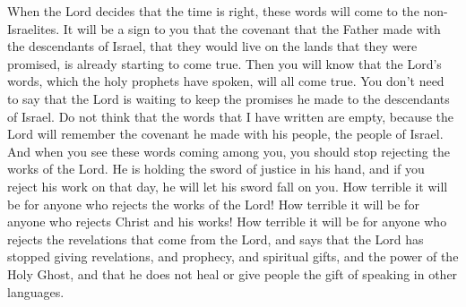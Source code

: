 When the Lord decides that the time is right, these words will come to the non-Israelites. It will be a sign to you that the covenant that the Father made with the descendants of Israel, that they would live on the lands that they were promised, is already starting to come true.
\bverse \iffalse And ye may know that the words of the Lord, which have been spoken by the holy prophets, shall all be fulfilled; and ye need not say that the Lord delays his coming unto the children of Israel. \fi
Then you will know that the Lord's words, which the holy prophets have spoken, will all come true. You don't need to say that the Lord is waiting to keep the promises he made to the descendants of Israel.
\bverse \iffalse And ye need not imagine in your hearts that the words which have been spoken are vain, for behold, the Lord will remember his covenant which he hath made unto his people of the house of Israel. \fi
Do not think that the words that I have written are empty, because the Lord will remember the covenant he made with his people, the people of Israel.
\bverse \iffalse And when ye shall see these sayings coming forth among you, then ye need not any longer spurn at the doings of the Lord, for the sword of his justice is in his right hand; and behold, at that day, if ye shall spurn at his doings he will cause that it shall soon overtake you. \fi
And when you see these words coming among you, you should stop rejecting the works of the Lord. He is holding the sword of justice in his hand, and if you reject his work on that day, he will let his sword fall on you.
\bverse \iffalse Wo unto him that spurneth at the doings of the Lord; yea, wo unto him that shall deny the Christ and his works! \fi
How terrible it will be for anyone who rejects the works of the Lord! How terrible it will be for anyone who rejects Christ and his works!
\bverse \iffalse Yea, wo unto him that shall deny the revelations of the Lord, and that shall say the Lord no longer worketh by revelation, or by prophecy, or by gifts, or by tongues, or by healings, or by the power of the Holy Ghost! \fi
How terrible it will be for anyone who rejects the revelations that come from the Lord, and says that the Lord has stopped giving revelations, and prophecy, and spiritual gifts, and the power of the Holy Ghost, and that he does not heal or give people the gift of speaking in other languages.
\bverse \iffalse Yea, and wo unto him that shall say at that day, to get gain, that there can be no miracle wrought by Jesus Christ; for he that doeth this shall become like unto the son of perdition, for whom there was no mercy, according to the word of Christ! \fi
